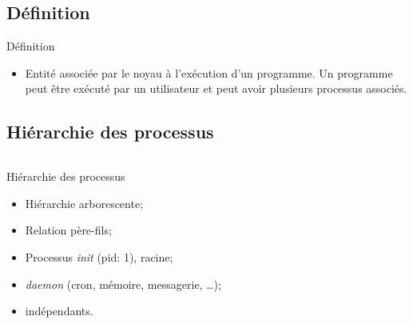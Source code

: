\begin{frame}{\sectitle}
    \def\subsectitle{Définition}
    \subsection{\subsectitle}

    \begin{alertblock}{\subsectitle}
        \begin{itemize}
            \item Entité associée par le noyau à l'exécution d'un programme. Un
                programme peut être exécuté par un utilisateur et peut avoir
                plusieurs processus associés.
        \end{itemize}
    \end{alertblock}

    \def\subsectitle{Hiérarchie des processus}
    \subsection{\subsectitle}

    \begin{columns}[b]
        \begin{block}{\subsectitle}
            \begin{itemize}
                \item Hiérarchie arborescente;
                \item Relation père-fils;
                \item Processus \textit{init} (pid: 1), racine;
                \item \textit{daemon} (cron, mémoire, messagerie, \dots);
                \item indépendants.
            \end{itemize}
        \end{block}


\end{columns}
\end{frame}
